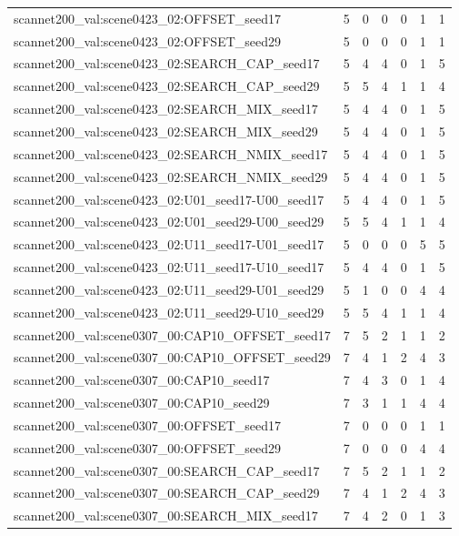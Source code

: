 \begin{table}[t]
\begin{tabular}{lrrrrrr}
scannet200\_val:scene0423\_02:OFFSET\_seed17 & 5 & 0 & 0 & 0 & 1 & 1 \\
scannet200\_val:scene0423\_02:OFFSET\_seed29 & 5 & 0 & 0 & 0 & 1 & 1 \\
scannet200\_val:scene0423\_02:SEARCH\_CAP\_seed17 & 5 & 4 & 4 & 0 & 1 & 5 \\
scannet200\_val:scene0423\_02:SEARCH\_CAP\_seed29 & 5 & 5 & 4 & 1 & 1 & 4 \\
scannet200\_val:scene0423\_02:SEARCH\_MIX\_seed17 & 5 & 4 & 4 & 0 & 1 & 5 \\
scannet200\_val:scene0423\_02:SEARCH\_MIX\_seed29 & 5 & 4 & 4 & 0 & 1 & 5 \\
scannet200\_val:scene0423\_02:SEARCH\_NMIX\_seed17 & 5 & 4 & 4 & 0 & 1 & 5 \\
scannet200\_val:scene0423\_02:SEARCH\_NMIX\_seed29 & 5 & 4 & 4 & 0 & 1 & 5 \\
scannet200\_val:scene0423\_02:U01\_seed17-U00\_seed17 & 5 & 4 & 4 & 0 & 1 & 5 \\
scannet200\_val:scene0423\_02:U01\_seed29-U00\_seed29 & 5 & 5 & 4 & 1 & 1 & 4 \\
scannet200\_val:scene0423\_02:U11\_seed17-U01\_seed17 & 5 & 0 & 0 & 0 & 5 & 5 \\
scannet200\_val:scene0423\_02:U11\_seed17-U10\_seed17 & 5 & 4 & 4 & 0 & 1 & 5 \\
scannet200\_val:scene0423\_02:U11\_seed29-U01\_seed29 & 5 & 1 & 0 & 0 & 4 & 4 \\
scannet200\_val:scene0423\_02:U11\_seed29-U10\_seed29 & 5 & 5 & 4 & 1 & 1 & 4 \\
scannet200\_val:scene0307\_00:CAP10\_OFFSET\_seed17 & 7 & 5 & 2 & 1 & 1 & 2 \\
scannet200\_val:scene0307\_00:CAP10\_OFFSET\_seed29 & 7 & 4 & 1 & 2 & 4 & 3 \\
scannet200\_val:scene0307\_00:CAP10\_seed17 & 7 & 4 & 3 & 0 & 1 & 4 \\
scannet200\_val:scene0307\_00:CAP10\_seed29 & 7 & 3 & 1 & 1 & 4 & 4 \\
scannet200\_val:scene0307\_00:OFFSET\_seed17 & 7 & 0 & 0 & 0 & 1 & 1 \\
scannet200\_val:scene0307\_00:OFFSET\_seed29 & 7 & 0 & 0 & 0 & 4 & 4 \\
scannet200\_val:scene0307\_00:SEARCH\_CAP\_seed17 & 7 & 5 & 2 & 1 & 1 & 2 \\
scannet200\_val:scene0307\_00:SEARCH\_CAP\_seed29 & 7 & 4 & 1 & 2 & 4 & 3 \\
scannet200\_val:scene0307\_00:SEARCH\_MIX\_seed17 & 7 & 4 & 2 & 0 & 1 & 3 \\

\end{tabular}
\end{table}
